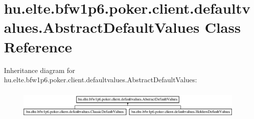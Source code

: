 \hypertarget{classhu_1_1elte_1_1bfw1p6_1_1poker_1_1client_1_1defaultvalues_1_1_abstract_default_values}{}\section{hu.\+elte.\+bfw1p6.\+poker.\+client.\+defaultvalues.\+Abstract\+Default\+Values Class Reference}
\label{classhu_1_1elte_1_1bfw1p6_1_1poker_1_1client_1_1defaultvalues_1_1_abstract_default_values}
Inheritance diagram for hu.\+elte.\+bfw1p6.\+poker.\+client.\+defaultvalues.\+Abstract\+Default\+Values\+:\begin{figure}[H]
\begin{center}
\leavevmode
\includegraphics[height=1.465969cm]{classhu_1_1elte_1_1bfw1p6_1_1poker_1_1client_1_1defaultvalues_1_1_abstract_default_values}
\end{center}
\end{figure}
